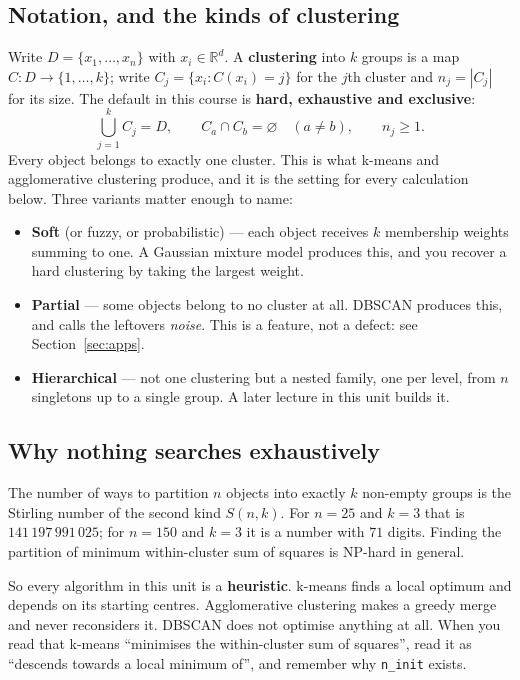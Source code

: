 \documentclass[11pt]{article}
\begin{document}
\subsection{Notation, and the kinds of clustering}

Write $D = \{x_1, \dots, x_n\}$ with $x_i \in \mathbb{R}^d$. A
\textbf{clustering} into $k$ groups is a map $C : D \to \{1, \dots, k\}$; write
$C_j = \{x_i : C(x_i) = j\}$ for the $j$th cluster and $n_j = |C_j|$ for its
size. The default in this course is \textbf{hard, exhaustive and exclusive}:
\[
  \bigcup_{j=1}^{k} C_j = D,
  \qquad
  C_a \cap C_b = \varnothing \quad (a \neq b),
  \qquad
  n_j \geq 1 .
\]
Every object belongs to exactly one cluster. This is what k-means and
agglomerative clustering produce, and it is the setting for every calculation
below. Three variants matter enough to name:

\begin{itemize}[leftmargin=*]
  \item \textbf{Soft} (or fuzzy, or probabilistic) --- each object receives $k$
    membership weights summing to one. A Gaussian mixture model produces this,
    and you recover a hard clustering by taking the largest weight.
  \item \textbf{Partial} --- some objects belong to no cluster at all. DBSCAN
    produces this, and calls the leftovers \emph{noise}. This is a feature,
    not a defect: see Section~\ref{sec:apps}.
  \item \textbf{Hierarchical} --- not one clustering but a nested family, one
    per level, from $n$ singletons up to a single group. A later lecture in
    this unit builds it.
\end{itemize}

\subsection{Why nothing searches exhaustively}

The number of ways to partition $n$ objects into exactly $k$ non-empty groups
is the Stirling number of the second kind $S(n,k)$. For $n = 25$ and $k = 3$
that is $141\,197\,991\,025$; for $n = 150$ and $k = 3$ it is a number with
$71$ digits. Finding the partition of minimum within-cluster sum of squares is
NP-hard in general.

So every algorithm in this unit is a \textbf{heuristic}. k-means finds a local
optimum and depends on its starting centres. Agglomerative clustering makes a
greedy merge and never reconsiders it. DBSCAN does not optimise anything at
all. When you read that k-means ``minimises the within-cluster sum of
squares'', read it as ``descends towards a local minimum of'', and remember
why \texttt{n\_init} exists.
\end{document}
